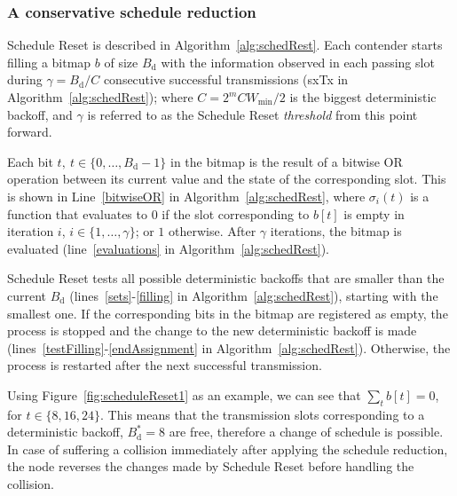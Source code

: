 		
		\subsubsection{A conservative schedule reduction}
		Schedule Reset is described in Algorithm~\ref{alg:schedRest}. Each contender starts filling a bitmap $b$ of size $B_{\text{d}}$ with the information observed in each passing slot during $\gamma=B_{\text{d}}/C$ consecutive successful transmissions (sxTx in Algorithm~\ref{alg:schedRest}); where $C=2^{m}CW_{\min}/2$ is the biggest deterministic backoff, and $\gamma$ is referred to as the Schedule Reset \emph{threshold} from this point forward.
		
		Each bit $t,~t\in\{0,\ldots ,B_{\text{d}}-1\}$ in the bitmap is the result of a bitwise OR operation between its current value and the state of the corresponding slot. This is shown in Line~\ref{bitwiseOR} in Algorithm~\ref{alg:schedRest}, where $\sigma_{i}(t)$ is a function that evaluates to $0$ if the slot corresponding to $b[t]$ is empty in iteration $i$, $i \in\{1,\ldots,\gamma\}$; or $1$ otherwise. After $\gamma$ iterations, the bitmap is evaluated (line~\ref{evaluations} in Algorithm~\ref{alg:schedRest}).
		
		
		
		Schedule Reset tests all possible deterministic backoffs that are smaller than the current $B_{\text{d}}$ (lines~\ref{sets}-\ref{filling} in Algorithm~\ref{alg:schedRest}), starting with the smallest one. If the corresponding bits in the bitmap are registered as empty, the process is stopped and the change to the new deterministic backoff is made (lines~\ref{testFilling}-\ref{endAssignment} in Algorithm~\ref{alg:schedRest}). Otherwise, the process is restarted after the next successful transmission.
		
		Using Figure~\ref{fig:scheduleReset1} as an example, we can see that $\sum\limits_{t} b[t]=0$, for $t\in\{8,16,24\}$. This means that the transmission slots corresponding to a deterministic backoff, $B^{*}_{\text{d}}=8$ are free, therefore a change of schedule is possible. In case of suffering a collision immediately after applying the schedule reduction, the node reverses the changes made by Schedule Reset before handling the collision.
		
